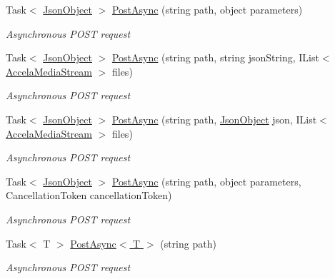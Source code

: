 \begin{DoxyCompactItemize}
Task$<$ \hyperlink{class_accela_1_1_windows_store_s_d_k_1_1_json_object}{Json\+Object} $>$ \hyperlink{class_accela_1_1_windows_store_s_d_k_1_1_accela_s_d_k_a76a89900c5bd3b2b199361cc80a85a6f}{Post\+Async} (string path, object parameters)
\begin{DoxyCompactList}\small\item\em Asynchronous P\+O\+S\+T request \end{DoxyCompactList}\item 
Task$<$ \hyperlink{class_accela_1_1_windows_store_s_d_k_1_1_json_object}{Json\+Object} $>$ \hyperlink{class_accela_1_1_windows_store_s_d_k_1_1_accela_s_d_k_a1ce65bfdcc46c001eed8e2d6a9b279e4}{Post\+Async} (string path, string json\+String, I\+List$<$ \hyperlink{class_accela_1_1_windows_store_s_d_k_1_1_accela_media_stream}{Accela\+Media\+Stream} $>$ files)
\begin{DoxyCompactList}\small\item\em Asynchronous P\+O\+S\+T request \end{DoxyCompactList}\item 
Task$<$ \hyperlink{class_accela_1_1_windows_store_s_d_k_1_1_json_object}{Json\+Object} $>$ \hyperlink{class_accela_1_1_windows_store_s_d_k_1_1_accela_s_d_k_afbaf4ac886f4262ecae31fd2be939dfe}{Post\+Async} (string path, \hyperlink{class_accela_1_1_windows_store_s_d_k_1_1_json_object}{Json\+Object} json, I\+List$<$ \hyperlink{class_accela_1_1_windows_store_s_d_k_1_1_accela_media_stream}{Accela\+Media\+Stream} $>$ files)
\begin{DoxyCompactList}\small\item\em Asynchronous P\+O\+S\+T request \end{DoxyCompactList}\item 
Task$<$ \hyperlink{class_accela_1_1_windows_store_s_d_k_1_1_json_object}{Json\+Object} $>$ \hyperlink{class_accela_1_1_windows_store_s_d_k_1_1_accela_s_d_k_a7faf8a8bc52f00f703d5f8a6200914b7}{Post\+Async} (string path, object parameters, Cancellation\+Token cancellation\+Token)
\begin{DoxyCompactList}\small\item\em Asynchronous P\+O\+S\+T request \end{DoxyCompactList}\item 
Task$<$ T $>$ \hyperlink{class_accela_1_1_windows_store_s_d_k_1_1_accela_s_d_k_af3721b6f4238003f798277bdf92dd069}{Post\+Async$<$ T $>$} (string path)
\begin{DoxyCompactList}\small\item\em Asynchronous P\+O\+S\+T request \end{DoxyCompactList}\item 

\end{DoxyCompactItemize}
